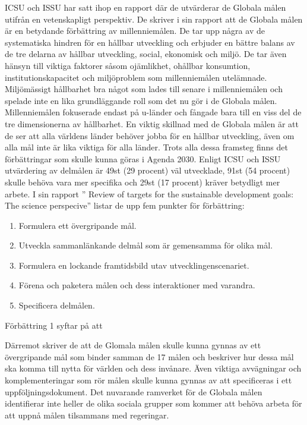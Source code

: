 \documentclass{report}
\begin{document}
ICSU och ISSU har satt ihop en rapport där de utvärderar de Globala målen utifrån en vetenskapligt perspektiv. De skriver i sin rapport att de Globala målen är en betydande förbättring av millenniemålen.  De tar upp några av de systematiska hindren för en hållbar utveckling och erbjuder en bättre balans av de tre delarna av hållbar utveckling, social, ekonomisk och miljö. De tar även hänsyn till viktiga faktorer såsom ojämlikhet, ohållbar konsumtion, institutionskapacitet och miljöproblem som millenniemålen utelämnade. Miljömässigt hållbarhet bra något som lades till senare i millenniemålen och spelade inte en lika grundläggande roll som det nu gör i de Globala målen. Millenniemålen fokuserade endast på u-länder och fångade bara till en viss del de tre dimensionerna av hållbarhet. En viktig skillnad med de Globala målen är att de ser att alla världens länder behöver jobba för en hållbar utveckling, även om alla mål inte är lika viktiga för alla länder. Trots alla dessa framsteg finns det förbättringar som skulle kunna göras i Agenda 2030. Enligt ICSU och ISSU utvärdering av delmålen är 49st (29 procent) väl utvecklade, 91st (54 procent) skulle behöva vara mer specifika och 29st (17 procent) kräver betydligt mer arbete. 
 I sin rapport ” Review of targets for the sustainable development goals: The science perspecive” listar de upp fem punkter för förbättring:  

\begin{enumerate}
\item Formulera ett övergripande mål.
\item Utveckla sammanlänkande delmål som är gemensamma för olika mål. 
 \item Formulera en lockande framtidsbild utav utvecklingenscenariet. 
\item Förena och paketera målen och dess interaktioner med varandra.
\item Specificera delmålen.
\end{enumerate} 

Förbättring 1 syftar på att 




 
 Därremot skriver de att de Glomala målen skulle kunna gynnas av ett övergripande mål som binder samman de 17 målen och beskriver hur dessa mål ska komma till nytta för världen och dess invånare. Även viktiga avvägningar och komplementeringar som rör målen skulle kunna gynnas av att specificeras i ett uppföljningsdokument. Det nuvarande ramverket för de Globala målen identifierar inte heller de olika sociala grupper som kommer att behöva arbeta för att uppnå målen tilsammans med regeringar. 
\end{document}
